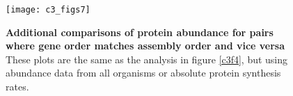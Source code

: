 \documentclass[a4paper,11pt,twoside,openright]{scrbook}
\begin{document}
\begin{figure}
    \texttt{[image: c3\_figs7]}
    \caption[Additional comparisons of protein abundance for pairs where gene order matches assembly order and vice versa]{\sffamily \textbf{Additional comparisons of protein abundance for pairs where gene order matches assembly order and vice versa} \\ \small These plots are the same as the analysis in figure \ref{c3f4}, but using abundance data from all organisms or absolute protein synthesis rates.}
    \label{c3fs7}
\end{figure}
\end{document}
